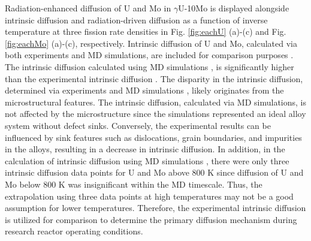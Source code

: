 \documentclass[preprint,12pt]{elsarticle}
\begin{document}
Radiation-enhanced diffusion of U and Mo in $\gamma$U-10Mo is displayed alongside intrinsic diffusion and radiation-driven diffusion as a function of inverse temperature at three fission rate densities in Fig. \ref{fig:eachU} (a)-(c) and Fig. \ref{fig:eachMo} (a)-(c), respectively. Intrinsic diffusion of U and Mo, calculated via both experiments and MD simulations, are included for comparison purposes \cite{huang2013, park2021atomistic}. The intrinsic diffusion calculated using MD simulations \cite{park2021atomistic}, is significantly higher than the experimental intrinsic diffusion \cite{huang2013}. The disparity in the intrinsic diffusion, determined via experiments \cite{huang2013} and MD simulations \cite{park2021atomistic}, likely originates from the microstructural features. The intrinsic diffusion, calculated via MD simulations, is not affected by the microstructure since the simulations represented an ideal alloy system without defect sinks. Conversely, the experimental results can be influenced by sink features such as dislocations, grain boundaries, and impurities in the alloys, resulting in a decrease in intrinsic diffusion. In addition, in the calculation of intrinsic diffusion using MD simulations \cite{park2021atomistic}, there were only three intrinsic diffusion data points for U and Mo above 800 K since diffusion of U and Mo below 800 K was insignificant within the MD timescale. Thus, the extrapolation using three data points at high temperatures may not be a good assumption for lower temperatures. Therefore, the experimental intrinsic diffusion is utilized for comparison to determine the primary diffusion mechanism during research reactor operating conditions.
\\
\end{document}
